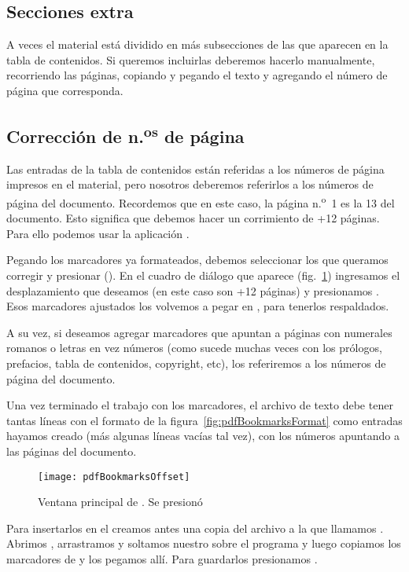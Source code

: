 \documentclass[%
	a5paper,
	10pt,
	twoside,
	openright,
	final,
]{memoir}
\begin{document}
{	\subsection{Secciones extra} A veces el material está dividido en más subsecciones de las que aparecen en la tabla de contenidos. Si queremos incluirlas deberemos hacerlo manualmente, recorriendo las páginas, copiando y pegando el texto y agregando el número de página que corresponda.

	\subsection{Corrección de \texorpdfstring{n.\textsuperscript{os}}{n.os} de página} Las entradas de la tabla de contenidos están referidas a los números de página impresos en el material, pero nosotros deberemos referirlos a los números de página del documento. Recordemos que en este caso, la página n.\textsuperscript{o}~1 es la 13 del documento. Esto significa que debemos hacer un corrimiento de +12 páginas. Para ello podemos usar la aplicación \pdg.

	Pegando los marcadores ya formateados, debemos seleccionar los que queramos corregir y presionar \keys{\boldpm} (). En el cuadro de diálogo que aparece (fig.~\ref{fig:pdfBookmarksOffset}) ingresamos el desplazamiento que deseamos (en este caso son +12 páginas) y presionamos . Esos marcadores ajustados los volvemos a pegar en , para tenerlos respaldados.

	A su vez, si deseamos agregar marcadores que apuntan a páginas con numerales romanos o letras en vez números (como sucede muchas veces con los prólogos, prefacios, tabla de contenidos, copyright, etc), los referiremos a los números de página del documento.

	Una vez terminado el trabajo con los marcadores, el archivo de texto  debe tener tantas líneas con el formato de la figura~\ref{fig:pdfBookmarksFormat} como entradas hayamos creado (más algunas líneas vacías tal vez), con los números apuntando a las páginas del documento.

	\begin{figure}
		\texttt{[image: pdfBookmarksOffset]}
		\caption[Ventana principal de \pdg.]{Ventana principal de \pdg. Se presionó \keys{\protect\boldpm}\label{fig:pdfBookmarksOffset}}
	\end{figure}

	Para insertarlos en el \pdf creamos antes una copia del archivo  a la que llamamos . Abrimos \pdg, arrastramos y soltamos nuestro \pdf sobre el programa y luego copiamos los marcadores de  y los pegamos allí. Para guardarlos presionamos .

}
\end{document}
